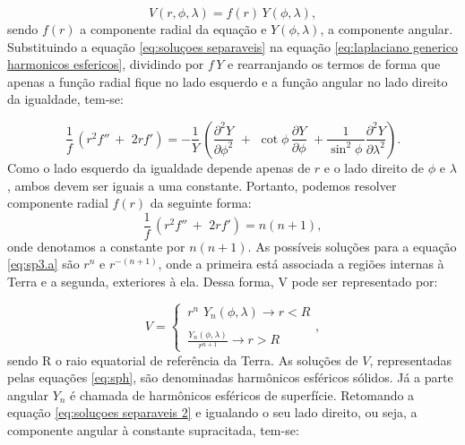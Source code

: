 \begin{equation}
\label{eq:soluçoes separaveis}
\displaystyle {V(r,\phi,\lambda) = f(r)\,Y(\phi,\lambda)},
\end{equation} sendo $f(r)$ a componente radial da equação e $Y(\phi,\lambda)$, a componente angular. Substituindo a equação \ref{eq:soluçoes separaveis} na equação \ref{eq:laplaciano generico harmonicos esfericos}, dividindo por $f\,Y$ e rearranjando os termos de forma que apenas a função radial fique no lado esquerdo e a função angular no lado direito da igualdade, tem-se:

\begin{equation}
\label{eq:soluçoes separaveis 2}
\displaystyle{ {\frac{1}{f}\,}\left({r^{2}f''\,} + {\,\,{2r}f'}\right) = -{\frac{1}{Y}\,}\left({\frac{\partial^{2}Y}{\partial \phi^{2}}}\,\, + \,\, {\cot \phi\,}{\frac{\partial Y}{\partial \phi}}\,\, + {\frac{1}{\sin^{2}\phi \,}}{\frac{\partial^{2}Y}{\partial \lambda^{2}}}\right) }.
\end{equation} Como o lado esquerdo da igualdade depende apenas de $r$ e o lado direito de $\phi$ e $\lambda$, ambos devem ser iguais a uma constante. Portanto, podemos resolver componente radial $f(r)$ da seguinte forma:
\begin{equation}
\label{eq:sp3.a}
\displaystyle{{\frac{1}{f}\,}\left({r^{2}f''\,} + {\,\,{2r}f'}\right) =  n(n+1)},
\end{equation} onde denotamos a constante por $n(n+1)$. As possíveis soluções para a equação \ref{eq:sp3.a} são $r^{n}$ e $r^{-(n+1)}$, onde a primeira está associada a regiões internas à Terra e a segunda, exteriores à ela. Dessa forma, V pode ser representado por:

\begin{equation}
V = \begin{cases}
\label{eq:sph}
\displaystyle{\,r^{n}\,\,Y_{n}(\phi,\lambda) \rightarrow{r <R}}\\ \\
\displaystyle{\,\frac{Y_{n}(\phi,\lambda)}{r^{n+1}} \rightarrow{r > R}}
\end{cases},
\end{equation} sendo R o raio equatorial de referência da Terra. As soluções de $V$, representadas pelas equações \ref{eq:sph}, são denominadas harmônicos esféricos sólidos. Já a parte angular $Y_{n}$ é chamada de harmônicos esféricos de superfície. Retomando a equação \ref{eq:soluçoes separaveis 2} e igualando o seu lado direito, ou seja, a componente angular à constante supracitada, tem-se:

